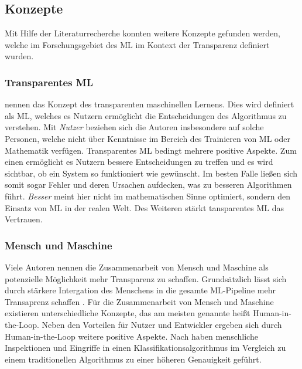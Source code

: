 \subsection{Konzepte}
\label{subsec_Konzepte}
Mit Hilfe der Literaturrecherche konnten weitere Konzepte gefunden werden, welche im Forschungsgebiet des ML im Kontext der Transparenz definiert wurden. 

\subsubsection{Transparentes ML}
\label{subsubsec_TML}
\cite{zhou20182d} nennen das Konzept des transparenten maschinellen Lernens. Dies wird definiert als ML, welches es Nutzern ermöglicht die Entscheidungen des Algorithmus zu verstehen. Mit \textit{Nutzer} beziehen sich die Autoren insbesondere  auf solche Personen, welche nicht über Kenntnisse im Bereich des Trainieren von ML oder Mathematik verfügen. Transparentes ML bedingt mehrere positive Aspekte. Zum einen ermöglicht es Nutzern bessere Entscheidungen zu treffen und es wird sichtbar, ob ein System so funktioniert wie gewünscht. Im besten Falle ließen sich somit sogar Fehler und deren Ursachen aufdecken, was zu besseren Algorithmen führt. \textit{Besser} meint hier nicht im mathematischen Sinne optimiert, sondern den Einsatz von ML in der realen Welt. Des Weiteren stärkt tansparentes ML das Vertrauen. 

\subsubsection{Mensch und Maschine} 
Viele Autoren nennen die Zusammenarbeit von Mensch und Maschine als potenzielle Möglichkeit mehr Transparenz zu schaffen. Grundsätzlich lässt sich durch stärkere Intergation des Menschens in die gesamte ML-Pipeline mehr Transaprenz schaffen 
\cite{zhou20182d}.
Für die Zusammenarbeit von Mensch und Maschine existieren unterschiedliche Konzepte, das am meisten genannte heißt Human-in-the-Loop.
Neben den Vorteilen für Nutzer und Entwickler ergeben sich durch Human-in-the-Loop weitere positive Aspekte. Nach \cite{tam2016analysis} haben menschliche Inspektionen und Eingriffe in einen Klassifikationsalgorithmus im Vergleich zu einem traditionellen Algorithmus zu einer höheren Genauigkeit geführt.

